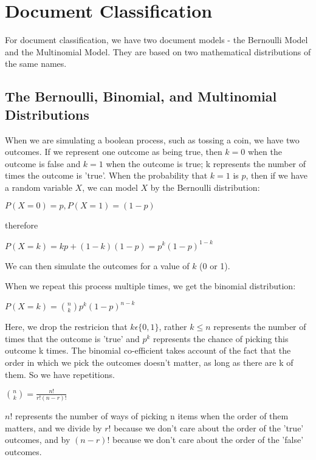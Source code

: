 \documentclass[10pt,a4paper]{article}
\begin{document}
		\section{Document Classification}
		
		For document classification, we have two document models - the Bernoulli Model and the Multinomial Model.
		They are based on two mathematical distributions of the same names.
		\subsection{The Bernoulli, Binomial, and Multinomial Distributions}
		When we are simulating a boolean process, such as tossing a coin, we have two outcomes. If we represent one outcome as being true, then $k = 0$ when the outcome is false and $k = 1$ when the outcome is true; k represents the number of times the outcome is 'true'.
		When the probability that $k = 1$ is $p$, then if we have a random variable $X$, we can model $X$ by the Bernoulli distribution:
		
		\begin{center}
			$ P(X = 0) = p, P(X = 1) = (1-p)$
			
			therefore
			
			$P(X=k) = kp + (1-k)(1-p) = p^k(1-p)^{1-k} $
		\end{center}
		We can then simulate the outcomes for a value of $k$ (0 or 1). 
		
		When we repeat this process multiple times, we get the binomial distribution:
		
		\begin{center}
			$
			P(X = k) = 	\binom{n}{k} p^k (1-p)^{n-k}
			$	
		\end{center} 
		Here, we drop the restricion that $k \epsilon \{0,1\}$, rather $k \leq n$ represents the number of times that the outcome is 'true' and $p^k$ represents the chance of picking this outcome k times. The binomial co-efficient takes account of the fact that the order in which we pick the outcomes doesn't matter, as long as there are k of them. So we have repetitions.
		
		\begin{center}
			$ \binom{n}{k} = \frac{n!}{r!(n-r)!} $
		\end{center}
		$n!$ represents the number of ways of picking n items when the order of them matters, and we divide by $r!$ because we don't care about the order of the 'true' outcomes, and by $(n-r)!$ because we don't care about the order of the 'false' outcomes.
		
\end{document}

